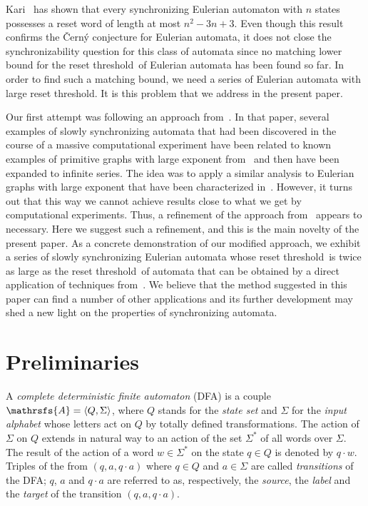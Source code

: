 \documentclass[12pt,twoside]{article}
\newcommand{\reth}{reset threshold}
\begin{document}
Kari~\cite{Ka03} has shown that every synchronizing Eulerian automaton with $n$
states possesses a reset word of length at most $n^2 -3n + 3$. Even though this
result confirms the \v{C}ern\'{y} conjecture for Eulerian automata, it does not
close the synchronizability question for this class of automata since no
matching lower bound for the \reth\ of Eulerian automata has been found so far.
In order to find such a matching bound, we need a series of Eulerian automata
with large \reth. It is this problem that we address in the present paper.

Our first attempt was following an approach from~\cite{AGV}. In that paper,
several examples of slowly synchronizing automata that had been discovered in
the course of a massive computational experiment have been related to known
examples of primitive graphs with large exponent from~\cite{DM64} and then have
been expanded to infinite series. The idea was to apply a similar analysis to
Eulerian graphs with large exponent that have been characterized
in~\cite{Shen00}. However, it turns out that this way we cannot achieve results
close to what we get by computational experiments. Thus, a refinement of the
approach from~\cite{AGV} appears to necessary. Here we suggest such a
refinement, and this is the main novelty of the present paper. As a concrete
demonstration of our modified approach, we exhibit a series of slowly
synchronizing Eulerian automata whose \reth\ is twice as large as the \reth\ of
automata that can be obtained by a direct application of techniques
from~\cite{AGV}. We believe that the method suggested in this paper can find a
number of other applications and its further development may shed a new light
on the properties of synchronizing automata.


\section{Preliminaries}
\label{preliminaries}
A \emph{complete deterministic finite automaton} (DFA) is
a couple $\mathrsfs{A}=\langle Q,\Sigma\rangle$, where $Q$ stands for the
\emph{state set} and $\Sigma$ for the \emph{input alphabet} whose letters act
on $Q$ by totally defined transformations. The action of $\Sigma$ on $Q$
extends in natural way to an action of the set $\Sigma^*$ of all words over
$\Sigma$. The result of the action of a word $w \in \Sigma^*$ on the state $q
\in Q$ is denoted by $q \cdot w$. Triples of the from $(q,a,q\cdot a)$ where
$q\in Q$ and $a\in\Sigma$ are called \emph{transitions} of the DFA; $q$, $a$
and $q\cdot a$ are referred to as, respectively, the \emph{source}, the
\emph{label} and the \emph{target} of the transition $(q,a,q\cdot a)$.
\end{document}

